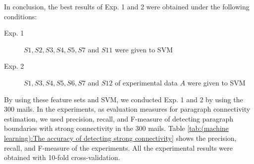 \documentclass[english]{jnlp_1.4}
\begin{document}
In conclusion, 
the best results of Exp. 1 and 2 
were obtained under the following conditions:
\begin{description}
 \item[Exp. 1] $S1, S2, S3, S4, S5, S7$ and $S11$ were given to SVM

 \item[Exp. 2] 
	    $S1, S3, S4, S5, S6, S7$ and $S12$ of experimental data $A$ 
	    were given to SVM 
\end{description}
By using these feature sets and SVM, 
we conducted Exp. 1 and 2 by using the 300 mails.
In the experiments, 
as evaluation measures for paragraph connectivity estimation, 
we used precision, recall, and F-measure of
detecting paragraph boundaries with strong connectivity
in the 300 mails. 
Table \ref{tab:(machine learning):The accuracy of detecting strong connectivity} shows 
the precision, recall, and F-measure of the experiments.
All the experimental results were obtained with 10-fold cross-validation.
 

\begin{table}[b]
 \label{tab:(machine learning):The accuracy of detecting strong connectivity}

\end{table}

 
\begin{table}[t]
 \label{tab:(our methods and textseg):The accuracy of detecting strong connectivity}

\end{table}
\end{document}
